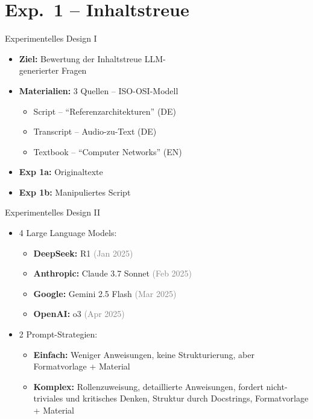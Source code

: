 \documentclass[usenames, dvipsnames, aspectratio=32]{beamer}
\begin{document}
\section{Exp.\ 1 -- Inhaltstreue}

\begin{frame}{Experimentelles Design I}
    \begin{itemize}
        \item \textbf{Ziel:} Bewertung der Inhaltstreue LLM-\\ generierter Fragen
        \item \textbf{Materialien:} 3 Quellen -- ISO-OSI-Modell
        \begin{itemize}
            \item Script -- \enquote{Referenzarchitekturen} (DE)
            \item Transcript -- Audio-zu-Text (DE)  
            \item Textbook -- \enquote{Computer Networks} (EN)
        \end{itemize}
        \item \textbf{Exp 1a:} Originaltexte 
        \item \textbf{Exp 1b:} Manipuliertes Script 
    \end{itemize}
\end{frame}
\begin{frame}{Experimentelles Design II}
    \begin{itemize}
        \item 4 Large Language Models: 
            \begin{itemize}
                \item \textbf{DeepSeek:} R1 \textcolor{gray}{(Jan 2025)}
                \item \textbf{Anthropic:} Claude 3.7 Sonnet \textcolor{gray}{(Feb 2025)}
                \item \textbf{Google:} Gemini 2.5 Flash \textcolor{gray}{(Mar 2025)}
                \item \textbf{OpenAI:} o3 \textcolor{gray}{(Apr 2025)}
            \end{itemize}
        \item 2 Prompt-Strategien:
            \begin{itemize}
                \item \textbf{Einfach:} Weniger Anweisungen, keine Strukturierung, aber Formatvorlage + Material
                \item \textbf{Komplex:} Rollenzuweisung, detaillierte Anweisungen, fordert nicht-triviales und kritisches Denken, Struktur durch Docstrings, Formatvorlage + Material 
            \end{itemize}
    \end{itemize}
\end{frame}
\end{document}

